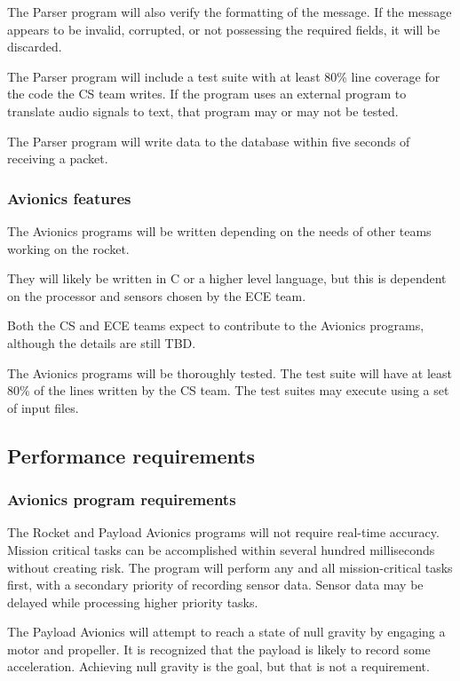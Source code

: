 \documentclass[onecolumn, draftclsnofoot, 10pt, compsoc]{IEEEtran}
\begin{document}
The Parser program will also verify the formatting of the message. If the message appears to be invalid, corrupted, or not possessing the required fields, it will be discarded.

The Parser program will include a test suite with at least 80\% line coverage for the code the CS team writes.  If the program uses an external program to translate audio signals to text, that program may or may not be tested.

The Parser program will write data to the database within five seconds of receiving a packet.

\subsubsection{Avionics features}
The Avionics programs will be written depending on the needs of other teams working on the rocket.

They will likely be written in C or a higher level language, but this is dependent on the processor and sensors chosen by the ECE team.

Both the CS and ECE teams expect to contribute to the Avionics programs, although the details are still TBD.

The Avionics programs will be thoroughly tested. The test suite will have at least 80\% of the lines written by the CS team.  The test suites may execute using a set of input files.

\subsection{Performance requirements}

\subsubsection{Avionics program requirements}
The Rocket and Payload Avionics programs will not require real-time accuracy.  Mission critical tasks can be accomplished within several hundred milliseconds without creating risk.  The program will perform any and all mission-critical tasks first, with a secondary priority of recording sensor data.  Sensor data may be delayed while processing higher priority tasks.

The Payload Avionics will attempt to reach a state of null gravity by engaging a motor and propeller.  It is recognized that the payload is likely to record some acceleration.  Achieving null gravity is the goal, but that is not a requirement.
\end{document}
